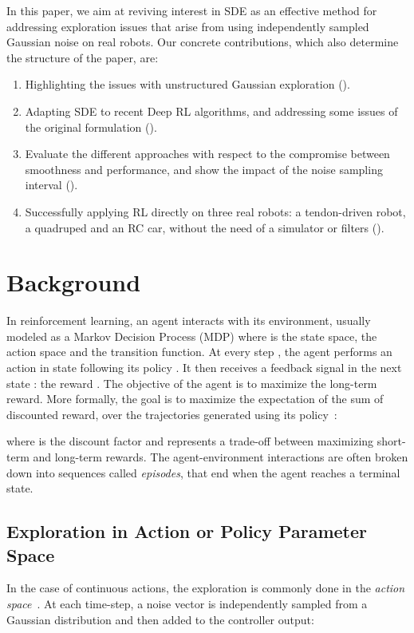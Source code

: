 \documentclass{article}
\newcommand{\SDE}{\textsc{SDE}\xspace}
\begin{document}
In this paper, we aim at reviving interest in \SDE as an effective method for addressing exploration issues that arise from using independently sampled Gaussian noise on real robots. Our concrete contributions, which also determine the structure of the paper, are:
\begin{enumerate}
  \item Highlighting the issues with unstructured Gaussian exploration ().
  \item Adapting \SDE to recent Deep RL algorithms, and addressing some issues of the original formulation ().
  \item Evaluate the different approaches with respect to the compromise between smoothness and performance, and show the impact of the noise sampling interval ().
  \item Successfully applying RL directly on three real robots: a tendon-driven robot, a quadruped and an RC car, without the need of a simulator or filters ().
\end{enumerate}


\section{Background}
\label{sec:background}

In reinforcement learning, an agent interacts with its environment, usually modeled as a Markov Decision Process (MDP)  where  is the state space,  the action space and  the transition function. At every step , the agent performs an action  in state  following its policy . It then receives a feedback signal in the next state : the reward . The objective of the agent is to maximize the long-term reward. More formally, the goal is to maximize the expectation of the sum of discounted reward, over the trajectories  generated using its policy~:

where  is the discount factor and represents a trade-off between maximizing short-term and long-term rewards.
The agent-environment interactions are often broken down into sequences called \textit{episodes}, that end when the agent reaches a terminal state.

\subsection{Exploration in Action or Policy Parameter Space}

In the case of continuous actions, the exploration is commonly done in the \textit{action space}~\citep{schulman2015trust, lillicrap2015continuous, mnih2016asynchronous, schulman2017proximal, haarnoja2017reinforcement, fujimoto2018addressing}. At each time-step, a noise vector  is independently sampled from a Gaussian distribution and then added to the controller output:
\end{document}
